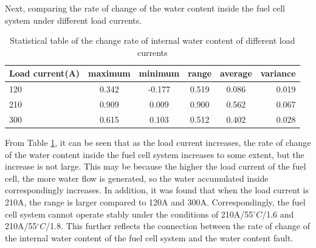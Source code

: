 Next, comparing the rate of change of the water content inside the fuel cell system under different load currents.

\begin{table}
	\centering
	\begin{center}
		\caption{Statistical table of the change rate of internal water content of different load currents}
		\label{tab:StatisticalTable}
		\begin{tabular}{l|c|c|c|c|r}
			\hline
			\textbf{Load current(A)} & \textbf{maximum} & \textbf{minimum} & \textbf{range} & \textbf{average} & \textbf{variance} \\
			\hline
			120                      & 0.342            & -0.177           & 0.519          & 0.086            & 0.019             \\
			210                      & 0.909            & 0.009            & 0.900          & 0.562            & 0.067             \\
			300                      & 0.615            & 0.103            & 0.512          & 0.402            & 0.028             \\
			\hline
		\end{tabular}
	\end{center}
\end{table}
From Table \ref{tab:StatisticalTable}, it can be seen that as the load current increases, the rate of change of the water content inside the fuel cell system increases to some extent, but the increase is not large. This may be because the higher the load current of the fuel cell, the more water flow is generated, so the water accumulated inside correspondingly increases. In addition, it was found that when the load current is 210A, the range is larger compared to 120A and 300A. Correspondingly, the fuel cell system cannot operate stably under the conditions of 210A/55$^{\circ}C$/1.6 and 210A/55$^{\circ}C$/1.8. This further reflects the connection between the rate of change of the internal water content of the fuel cell system and the water content fault.
\par
